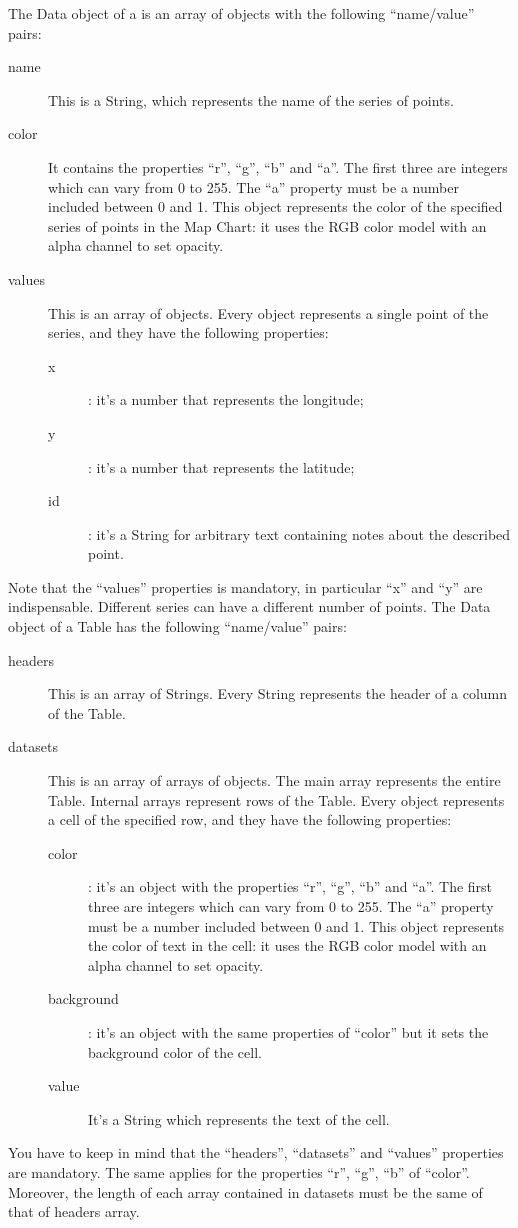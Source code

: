 			The Data object of a  is an array of objects with the following “name/value” pairs:
			\begin{description}
				\item[name] This is a String, which represents the name of the series of points.
				\item[color] It contains the properties “r”, “g”, “b” and “a”. The first three are integers which can vary from 0 to 255. The “a” property must be a number included between 0 and 1. This object represents the color of the specified series of points in the Map Chart: it uses the RGB color model with an alpha channel to set opacity.
				\item[values] This is an array of objects. Every object represents a single point of the series, and they have the following properties:
					\begin{description}
						\item[x]: it's a number that represents the longitude;
						\item[y]: it's a number that represents the latitude;
						\item[id]: it's a String for arbitrary text containing notes about the described point.
					\end{description}
			\end{description}
			Note that the “values” properties is mandatory, in particular “x” and “y” are indispensable. Different series can have a different number of points.
			The Data object of a Table has the following “name/value” pairs:
			\begin{description}
				\item[headers] This is an array of Strings. Every String represents the header of a column of the Table.
				\item[datasets] This is an array of arrays of objects. The main array represents the entire Table. Internal arrays represent rows of the Table. Every object represents a cell of the specified row, and they have the following properties:
				\begin{description}
					\item[color]: it's an object with the properties “r”, “g”, “b” and “a”. The first three are integers which can vary from 0 to 255. The “a” property must be a number included between 0 and 1.
					This object represents the color of text in the cell: it uses the RGB color model with an alpha channel to set opacity.
					\item[background]: it's an object with the same properties of “color” but it sets the background color of the cell.
					\item[value] It's a String which represents the text of the cell.
				\end{description}
			\end{description}
			You have to keep in mind that the “headers”, “datasets” and “values” properties are mandatory. The same applies for the properties “r”, “g”, “b” of “color”. Moreover, the length of each array contained in datasets must be the same of that of headers array.

